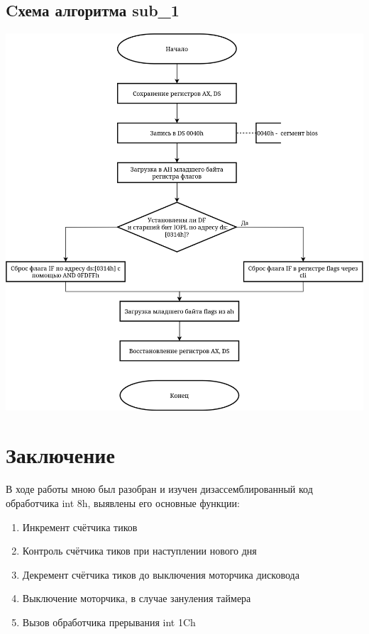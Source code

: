 \documentclass[a4paper,14pt]{article}
\begin{document}
	\subsection{Cхема алгоритма sub\_1}
	\begin{center}
		\includegraphics[height=0.67\textheight]{img/sub}
	\end{center}
	\pagebreak
	\section{Заключение}
	В ходе работы мною был разобран и изучен дизассемблированный код обработчика int 8h, выявлены его основные функции:
	\begin{enumerate}
		\item Инкремент счётчика тиков
		\item Контроль счётчика тиков при наступлении нового дня
		\item Декремент счётчика тиков до выключения моторчика дисковода
		\item Выключение моторчика, в случае зануления таймера
		\item Вызов обработчика прерывания int 1Ch
	\end{enumerate}
	
	
	
	
\end{document}
